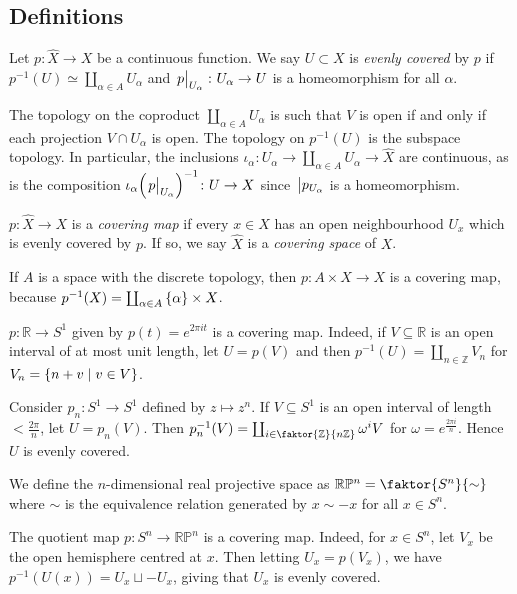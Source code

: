 \subsection{Definitions}
\begin{definition}
	Let \( p : \hat X \to X \) be a continuous function.
	We say \( U \subset X \) is \emph{evenly covered} by \( p \) if \( p^{-1}(U) \simeq \coprod_{\alpha \in A} U_\alpha \) and \( \eval{p}_{U_\alpha} \colon U_\alpha \to U \) is a homeomorphism for all \( \alpha \).
\end{definition}
The topology on the coproduct \( \coprod_{\alpha \in A} U_\alpha \) is such that \( V \) is open if and only if each projection \( V \cap U_\alpha \) is open.
The topology on \( p^{-1}(U) \) is the subspace topology.
In particular, the inclusions \( \iota_\alpha \colon U_\alpha \to \coprod_{\alpha \in A} U_\alpha \to \hat X \) are continuous, as is the composition \( \iota_\alpha \qty(\eval{p}_{U_\alpha})^{-1} \colon U \to X \) since \( \eval p_{U_\alpha} \) is a homeomorphism.
\begin{definition}
	\( p \colon \hat X \to X \) is a \emph{covering map} if every \( x \in X \) has an open neighbourhood \( U_x \) which is evenly covered by \( p \).
	If so, we say \( \hat X \) is a \emph{covering space} of \( X \).
\end{definition}
\begin{example}
	If \( A \) is a space with the discrete topology, then \( p \colon A \times X \to X \) is a covering map, because \( p^{-1}(X) = \coprod_{\alpha \in A} \qty{\alpha} \times X \).
\end{example}
\begin{example}
	\( p \colon \mathbb R \to S^1 \) given by \( p(t) = e^{2\pi i t} \) is a covering map.
	Indeed, if \( V \subseteq \mathbb R \) is an open interval of at most unit length, let \( U = p(V) \) and then \( p^{-1}(U) = \coprod_{n \in \mathbb Z} V_n \) for \( V_n = \qty{n + v \mid v \in V} \).
\end{example}
\begin{example}
	Consider \( p_n \colon S^1 \to S^1 \) defined by \( z \mapsto z^n \).
	If \( V \subseteq S^1 \) is an open interval of length \( <\frac{2\pi}{n} \), let \( U = p_n(V) \).
	Then \( p_n^{-1}(V) = \coprod_{i \in \faktor{\mathbb Z}{n\mathbb Z}} \omega^i V \) for \( \omega = e^{\frac{2\pi i}{n}} \).
	Hence \( U \) is evenly covered.
\end{example}
\begin{definition}
	We define the \( n \)-dimensional real projective space as \( \mathbb R\mathbb P^n = \faktor{S^n}{\sim} \) where \( \sim \) is the equivalence relation generated by \( x \sim -x \) for all \( x \in S^n \).
\end{definition}
\begin{example}
	The quotient map \( p \colon S^n \to \mathbb R\mathbb P^n \) is a covering map.
	Indeed, for \( x \in S^n \), let \( V_x \) be the open hemisphere centred at \( x \).
	Then letting \( U_x = p(V_x) \), we have \( p^{-1}(U(x)) = U_x \sqcup -U_x \), giving that \( U_x \) is evenly covered.
\end{example}

